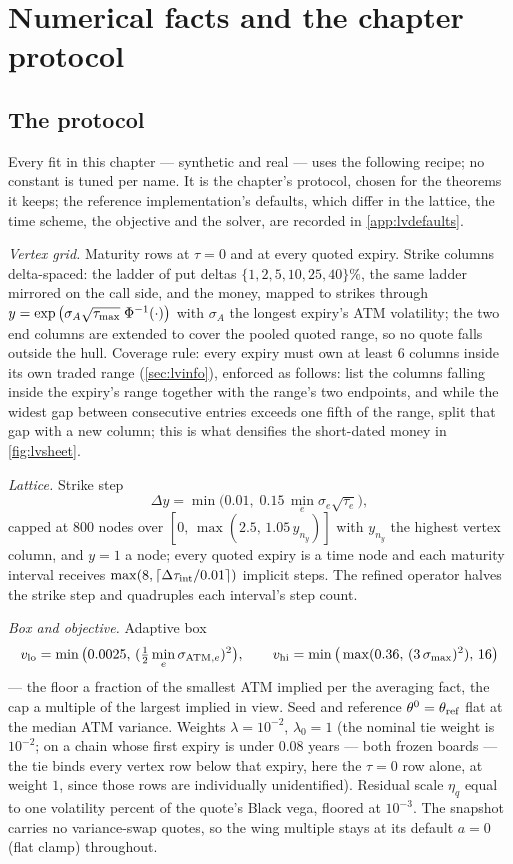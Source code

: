 \section{Numerical facts and the chapter protocol}
\label{app:lvnumerics}

\subsection{The protocol}
\label{app:lvprotocol}

Every fit in this chapter --- synthetic and real --- uses the following
recipe; no constant is tuned per name.  It is the chapter's protocol,
chosen for the theorems it keeps; the reference implementation's
defaults, which differ in the lattice, the time scheme, the objective
and the solver, are recorded in \cref{app:lvdefaults}.

\emph{Vertex grid.}  Maturity rows at $\tau=0$ and at every quoted expiry.
Strike columns delta-spaced: the ladder of put deltas
$\{1,2,5,10,25,40\}\%$, the same ladder mirrored on the call side, and
the money, mapped to
strikes through
$y=\exp\big(\sigma_A\sqrt{\tau_{\max}}\;\Phi^{-1}(\cdot)\big)$ with
$\sigma_A$ the longest expiry's ATM volatility; the two end columns are
extended to cover the pooled quoted range, so no quote falls outside the
hull.  Coverage rule: every expiry must own at least $6$ columns inside
its own traded range (\cref{sec:lvinfo}), enforced as follows: list
the columns falling inside the expiry's range together with the
range's two endpoints, and while the widest gap between consecutive
entries exceeds one fifth of the range, split that gap with a new
column; this is what densifies the short-dated money in
\cref{fig:lvsheet}.

\emph{Lattice.}  Strike step
\[
\Delta y=\min\big(0.01,\;0.15\,\min_e\sigma_e\sqrt{\tau_e}\big),
\]
capped at $800$ nodes over $[0,\,\max(2.5,\,1.05\,y_{n_y})]$ with
$y_{n_y}$ the highest vertex column, and $y=1$ a node; every quoted
expiry is a time node and each maturity interval receives
$\max(8,\lceil\Delta\tau_{\rm int}/0.01\rceil)$ implicit steps.
The refined operator halves the strike step and quadruples each
interval's step count.

\emph{Box and objective.}  Adaptive box
\[
v_{\rm lo}=\min\big(0.0025,\,(\tfrac12\min_e\sigma_{{\rm ATM},e})^{2}\big),
\qquad
v_{\rm hi}=\min\big(\max(0.36,\,(3\,\sigma_{\max})^{2}),\,16\big)
\]
--- the floor a fraction of the smallest ATM implied per the averaging
fact, the cap a multiple of the largest implied in view.  Seed and reference
$\theta^{0}=\theta_{\rm ref}$ flat at the median ATM variance.  Weights
$\lambda=10^{-2}$, $\lambda_0=1$ (the nominal tie weight is $10^{-2}$;
on a chain whose first expiry is under $0.08$ years --- both frozen
boards --- the tie binds every vertex row below that expiry, here the
$\tau=0$ row alone, at weight $1$, since those rows are individually
unidentified).  Residual scale
$\eta_q$ equal to one
volatility percent of the quote's Black vega, floored at $10^{-3}$.  The
snapshot carries no variance-swap quotes, so the wing multiple stays at
its default $a=0$ (flat clamp) throughout.

